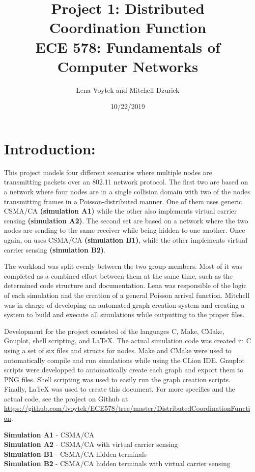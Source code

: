 \documentclass[12pt]{article}
\title {{\bf Project 1: Distributed Coordination Function} \\
\large{ECE 578: Fundamentals of Computer Networks}}
\author{Lena Voytek and Mitchell Dzurick}
\date{10/22/2019}
\begin{document}
\maketitle{}

\section*{Introduction:}

    This project models four different scenarios where multiple nodes are transmitting packets over an 802.11 network protocol. The first two are based on a network where four nodes are in a single collision domain with two of the nodes transmitting frames in a Poisson-distributed manner. One of them uses generic CSMA/CA {\bf (simulation A1)} while the other also implements virtual carrier sensing {\bf (simulation A2)}. The second set are based on a network where the two nodes are sending to the same receiver while being hidden to one another. Once again, on uses CSMA/CA {\bf (simulation B1)}, while the other implements virtual carrier sensing {\bf (simulation B2)}.
    \par
    The workload was split evenly between the two group members. Most of it was completed as a combined effort between them at the same time, such as the determined code structure and documentation. Lena was responsible of the logic of each simulation and the creation of a general Poisson arrival function. Mitchell was in charge of developing an automated graph creation system and creating a system to build and execute all simulations while outputting to the proper files.
    \par
    Development for the project consisted of the languages C, Make, CMake, Gnuplot, shell scripting, and \LaTeX{}. The actual simulation code was created in C using a set of six files and structs for nodes. Make and CMake were used to automatically compile and run simulations while using the CLion IDE. Gnuplot scripts were developped to automatically create each graph and export them to PNG files. Shell scripting was used to easily run the graph creation scripts. Finally, \LaTeX{} was used to create this document. For more specifics and the actual code, see the project on Github at \\
    \textcolor{blue}{ \href{https://github.com/lvoytek/ECE578/tree/master/DistributedCoordinationFunction}{https://github.com/lvoytek/ECE578/tree/master/DistributedCoordinationFunction}}.
    
    {\bf Simulation A1} - CSMA/CA \\
    {\bf Simulation A2} - CSMA/CA with virtual carrier sensing \\
    {\bf Simulation B1} - CSMA/CA hidden terminals \\
    {\bf Simulation B2} - CSMA/CA hidden terminals with virtual carrier sensing
\clearpage
\end{document}
